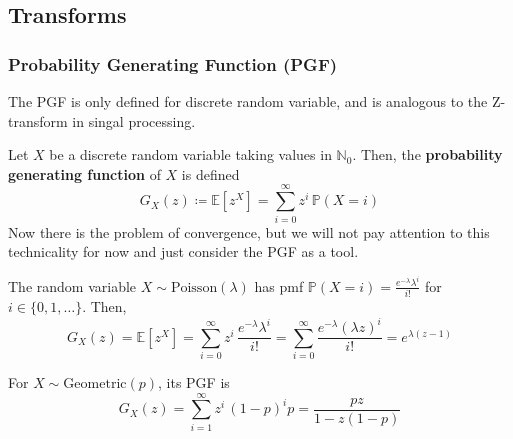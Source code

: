 \subsection{Transforms}

  \subsubsection{Probability Generating Function (PGF)}

    The PGF is only defined for discrete random variable, and is analogous to the Z-transform in singal processing. 

    \begin{definition}
      Let $X$ be a discrete random variable taking values in $\mathbb{N}_0$. Then, the \textbf{probability generating function} of $X$ is defined 
      \begin{equation}
        G_X (z) \coloneqq \mathbb{E}[z^X] = \sum_{i=0}^\infty z^i \, \mathbb{P}(X = i)
      \end{equation}
      Now there is the problem of convergence, but we will not pay attention to this technicality for now and just consider the PGF as a tool. 
    \end{definition}

    \begin{example}
      The random variable $X \sim \mathrm{Poisson}(\lambda)$ has pmf $\mathbb{P}(X = i) = \frac{e^{-\lambda} \lambda^i}{i!}$ for $i \in \{0, 1, \ldots\}$. Then, 
      \begin{equation}
        G_X (z) = \mathbb{E}[z^X] = \sum_{i=0}^\infty z^i \, \frac{e^{-\lambda} \lambda^i}{i!} = \sum_{i=0}^\infty \frac{e^{-\lambda} (\lambda z)^i}{i!} = e^{\lambda(z - 1)}
      \end{equation}
    \end{example}

    \begin{example}
      For $X \sim \mathrm{Geometric}(p)$, its PGF is 
      \begin{equation}
        G_X (z) = \sum_{i=1}^\infty z^i \, (1 - p)^i p = \frac{p z}{1 - z(1 - p)}
      \end{equation}
    \end{example}

